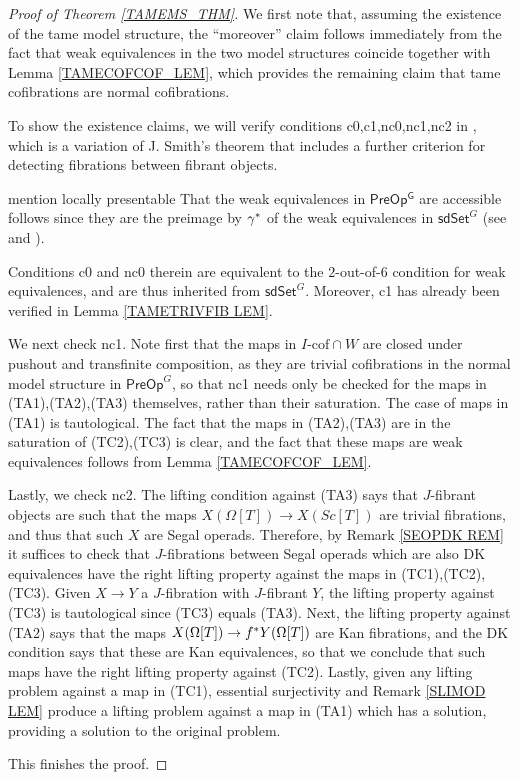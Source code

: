 \documentclass[a4paper,10pt
,draft
]{article}%
\numberwithin{equation}{section}
\numberwithin{figure}{section}
\theoremstyle{definition} %
\newcommand{\1}{\ensuremath{\mathbbm 1}}%
\begin{document}
\begin{proof}[Proof of Theorem \ref{TAMEMS_THM}]
	We first note that, assuming the existence of the tame model structure,
	the ``moreover'' claim
	follows immediately from the fact that weak equivalences in the two model structures coincide together with  
	Lemma \ref{TAMECOFCOF_LEM},
	which provides the remaining claim that tame cofibrations are normal cofibrations.
	
	To show the existence claims, we will verify conditions c0,c1,nc0,nc1,nc2 in 
	\cite[Prop. 1.3]{Sta14},
	which is a variation of 
	J. Smith's theorem \cite[Thm. 1.7]{Bek00}
	that includes a further criterion for detecting 
	fibrations between fibrant objects.

	{\color{blue} mention locally presentable}
	That the weak equivalences in $\mathsf{PreOp^G}$ are accessible follows since they are the preimage by $\gamma^{\**}$ of the weak equivalences in 
	$\mathsf{sdSet}^G$ 
	(see \cite[Cor. A.2.6.5]{Lur09} and \cite[Cor. A.2.6.6]{Lur09}).

	
	Conditions c0 and nc0 therein are equivalent to the $2$-out-of-$6$
	condition for weak equivalences, and are thus inherited 
	from $\mathsf{sdSet}^G$.
	Moreover, c1 has already been verified in Lemma \ref{TAMETRIVFIB LEM}. 

We next check nc1. 
Note first that the maps in $I\text{-cof} \cap W$
are closed under pushout and transfinite composition, as they are trivial cofibrations in the normal model structure in 
$\mathsf{PreOp}^G$,
so that nc1 needs only be checked for the maps in (TA1),(TA2),(TA3) themselves, rather than their saturation.
The case of maps in (TA1) is tautological.
The fact that the maps in 
(TA2),(TA3) are in the saturation of (TC2),(TC3) is clear, and the fact that these maps are weak equivalences follows from 
Lemma \ref{TAMECOFCOF_LEM}.

	
Lastly, we check nc2.
The lifting condition against (TA3) says that $J$-fibrant objects are such that the maps $X(\Omega[T]) \to X(Sc[T])$
are trivial fibrations, and thus that such $X$ are Segal operads.
Therefore, by Remark \ref{SEOPDK REM} it suffices to check that $J$-fibrations between Segal operads which are also DK equivalences have the right lifting property against the maps in (TC1),(TC2),(TC3).
Given $X \to Y$ a $J$-fibration with $J$-fibrant $Y$,
the lifting property against (TC3) is tautological since 
(TC3) equals (TA3).
Next, the lifting property against (TA2) says that the maps
$X(\Omega[T]) \to f^{\**} Y(\Omega[T])$
are Kan fibrations, and the DK condition says that these are Kan equivalences,
so that we conclude that such maps have the right lifting property against (TC2).
Lastly, given any lifting problem against a map in (TC1),
essential surjectivity and Remark \ref{SLIMOD LEM}
produce a lifting problem against a map in (TA1) which has a solution, providing a solution to the original problem.

This finishes the proof.	
\end{proof}
\end{document}
